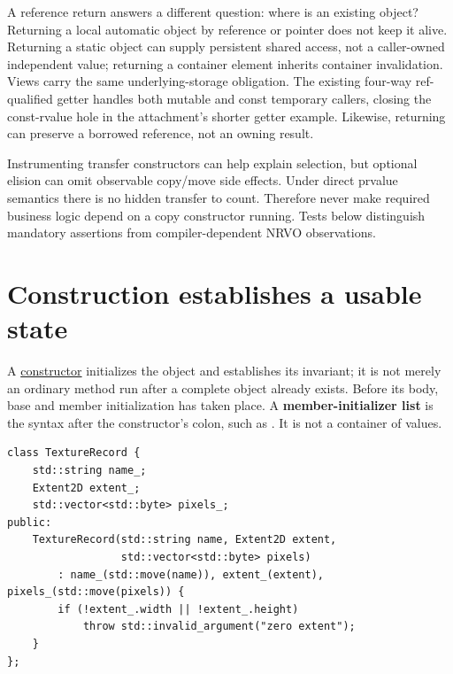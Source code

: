 A reference return answers a different question: where is an existing object? Returning a local automatic object by reference or pointer does not keep it alive. Returning a static object can supply persistent shared access, not a caller-owned independent value; returning a container element inherits container invalidation. Views carry the same underlying-storage obligation. The existing four-way ref-qualified getter handles both mutable and const temporary callers, closing the const-rvalue hole in the attachment's shorter getter example. Likewise,  returning  can preserve a borrowed reference, not an owning result.

Instrumenting transfer constructors can help explain selection, but optional elision can omit observable copy/move side effects. Under direct prvalue semantics there is no hidden transfer to count. Therefore never make required business logic depend on a copy constructor running. Tests below distinguish mandatory assertions from compiler-dependent NRVO observations.

\section{Construction establishes a usable state}\label{01-foundations-i-ch003-construction-establishes-a-usable-state}

\hypertarget{01-foundations-i-ch003-construction-establishes-a-usable-state}{}

A \hyperref[appendix-7f8ec83d0886]{constructor} initializes the object and establishes its invariant; it is not merely an ordinary method run after a complete object already exists. Before its body, base and member initialization has taken place. A \textbf{member-initializer list} is the syntax after the constructor's colon, such as . It is not a  container of values.

\begin{verbatim}
class TextureRecord {
    std::string name_;
    Extent2D extent_;
    std::vector<std::byte> pixels_;
public:
    TextureRecord(std::string name, Extent2D extent,
                  std::vector<std::byte> pixels)
        : name_(std::move(name)), extent_(extent), pixels_(std::move(pixels)) {
        if (!extent_.width || !extent_.height)
            throw std::invalid_argument("zero extent");
    }
};
\end{verbatim}

